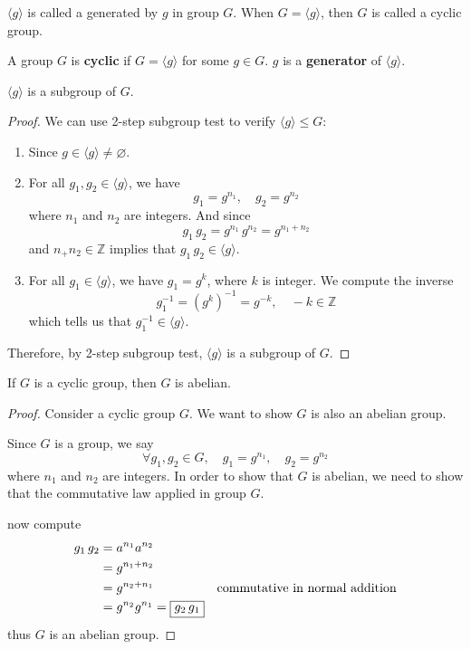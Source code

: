 \begin{remark}
    $\langle g \rangle$ is called a  generated by $g$ in group $G$. When $G = \langle g \rangle$, then $G$ is called 
    a cyclic group.
\end{remark}

\begin{definition}
    A group $G$ is \textbf{cyclic} if $G = \langle g \rangle$ for some $g \in G$. $g$ is a \textbf{generator} of $\langle g \rangle$.
\end{definition}

\begin{lemma}
    $\langle g \rangle$ is a subgroup of $G$.
\end{lemma}
\begin{proof}
    We can use 2-step subgroup test to verify $\langle g \rangle \leq G$:
    \begin{enumerate}
        \item Since $g \in \langle g \rangle \neq \varnothing$.
        \item For all $g_1, g_2 \in \langle g \rangle$, we have 
        \[
            g_1 = g^{n_1}, \quad g_2 = g^{n_2}
        \]
        where $n_1$ and $n_2$ are integers. And since 
        \[
            g_1\, g_2 = g^{n_1} \, g^{n_2} = g^{n_1 + n_2}
        \]
        and $n_ + n_2 \in \mathbb{Z}$ implies that $g_1 \, g_2 \in \langle g \rangle$.
        \item For all $g_1 \in \langle g \rangle$, we have $g_1 = g^{k}$, where $k$ is integer. We compute the inverse
        \[
            g_1^{-1} = (g^{k})^{-1} = g^{-k}, \quad -k \in \mathbb{Z}
        \]
        which tells us that $g^{-1}_1 \in \langle g \rangle$.
    \end{enumerate}

    Therefore, by 2-step subgroup test, $\langle g \rangle$ is a subgroup of $G$.
\end{proof}

\begin{lemma}
    If $G$ is a cyclic group, then $G$ is abelian.
\end{lemma}
\begin{proof}
    Consider a cyclic group $G$. We want to show $G$ is also an abelian group.
    
    Since $G$ is a group, we say 
    \[
        \forall g_1, g_2 \in G, \quad g_1 = g^{n_1}, \quad g_2 = g^{n_2}
    \]
    where $n_1$ and $n_2$ are integers. In order to show that $G$ is abelian, we need to show that 
    the commutative law applied in group $G$.

    now compute 
    \begin{align*}
        g_1\,g_2 &= a^{n_1} a^{n_2}\\
        &= g^{n_1 + n_2}\\
        &= g^{n_2 + n_1} & \text{commutative in normal addition}\\
        &= g^{n_2} g^{n_1} = \fbox{$g_2\, g_1$}
    \end{align*}
    thus $G$ is an abelian group.
\end{proof}


